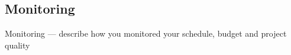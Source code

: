 \subsection{Monitoring}

Monitoring — describe how you monitored your schedule, budget and project quality
